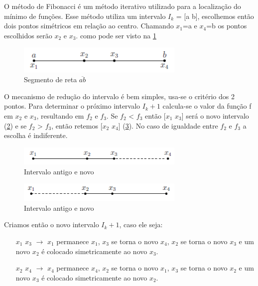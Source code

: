 O método de Fibonacci é um método iterativo utilizado para a localização do mínimo de funções. Esse método utiliza um intervalo $ I_k $ = [a b], escolhemos então dois pontos simétricos em relação ao centro. Chamando $ x_1 $=a e $ x_4 $=b os pontos escolhidos serão $ x_2 $ e $ x_3 $. como pode ser visto na \ref{fig:ab}

\begin{figure}[h]
	\begin{center}
		\includegraphics[width=8cm]{../fibonacci/intervalo_inicial.png}   
		\caption{Segmento de reta $ \overline{ab} $}
		\label{fig:ab}
	\end{center}
\end{figure}

O mecanismo de redução do intervalo é bem simples, usa-se o critério dos 2 pontos. Para determinar o próximo intervalo $ I_k+1 $ calcula-se o valor da função f em $ x_2 $ e $ x_3 $, resultando em $ f_2 $ e $ f_3 $. Se $ f_2 $ < $ f_3 $ então [$ x_1 $ $ x_3 $] será o novo intervalo (\ref{fig:x1x3}) e se $ f_2 $ > $ f_3 $, então retemos [$ x_2 $ $ x_4 $] (\ref{fig:x2x4}). No caso de igualdade entre $ f_2 $ e $ f_3 $ a escolha é indiferente. 

\begin{figure}[h]
	\begin{center}
		\includegraphics[width=8cm]{../fibonacci/x1x3.png}   
		\caption{Intervalo antigo e novo}
		\label{fig:x1x3}
	\end{center}
\end{figure}

\begin{figure}[h]
	\begin{center}
		\includegraphics[width=8cm]{../fibonacci/x2x4.png}   
		\caption{Intervalo antigo e novo}
		\label{fig:x2x4}
	\end{center}
\end{figure}

Criamos então o novo intervalo $ I_k+1 $, caso ele seja:
\begin{itemize}
	\item [$ x_1 $ $ x_3 $] $\rightarrow$ $ x_1 $ permanece $ x_1 $, $ x_3 $ se torna o novo $ x_4 $, $ x_2 $ se torna o novo $ x_3 $ e um novo $ x_2 $ é colocado simetricamente ao novo $ x_3 $.
	\item [$ x_2 $ $ x_4 $] $\rightarrow$ $ x_4 $ permanece $ x_4 $, $ x_2 $ se torna o novo $ x_1 $, $ x_3 $ se torna o novo $ x_2 $ e um novo $ x_3 $ é colocado simetricamente ao novo $ x_2 $.
\end{itemize}

